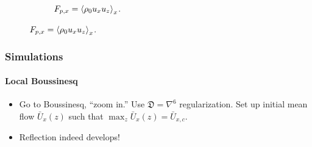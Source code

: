 \documentclass[dvipsnames, 10pt]{beamer}
\DeclarePairedDelimiter\ev{\langle}{\rangle}
\begin{document}
\begin{frame}
\begin{figure}[t]
\begin{subfigure}{0.53\textwidth}
            \caption{$F_{p, x} = \ev*{\rho_0 u_x u_z}_x$.}
        \end{subfigure}
        \hspace*{-19mm}%
    \end{figure}
\end{frame}

\begin{frame}
    \frametitle{Simulations}
    \framesubtitle{Local Boussinesq}

    \begin{itemize}
        \item Go to Boussinesq, ``zoom in.'' Use $\mathfrak{D} = \nabla^6$
            regularization. Set up initial mean flow $\bar{U}_x(z)$ such that
            $\max_z \bar{U}_x(z) = \bar{U}_{x, c}$.

        \item Reflection indeed develops!
    \end{itemize}


\end{frame}
\end{document}
